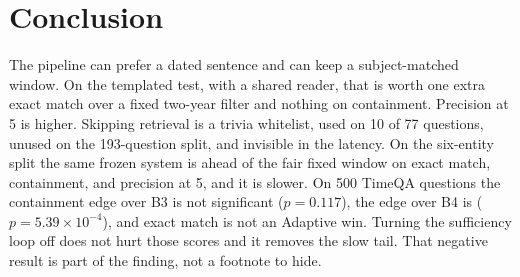 \documentclass[11pt]{article}
\begin{document}
\section{Conclusion}

The pipeline can prefer a dated sentence and can keep a subject-matched window.
On the templated test, with a shared reader, that is worth one extra exact match over a fixed two-year filter and nothing on containment.
Precision at 5 is higher.
Skipping retrieval is a trivia whitelist, used on 10 of 77 questions, unused on the 193-question split, and invisible in the latency.
On the six-entity split the same frozen system is ahead of the fair fixed window on exact match, containment, and precision at 5, and it is slower.
On 500 TimeQA questions the containment edge over B3 is not significant ($p=0.117$), the edge over B4 is ($p=5.39\times 10^{-4}$), and exact match is not an Adaptive win.
Turning the sufficiency loop off does not hurt those scores and it removes the slow tail.
That negative result is part of the finding, not a footnote to hide.
\end{document}
